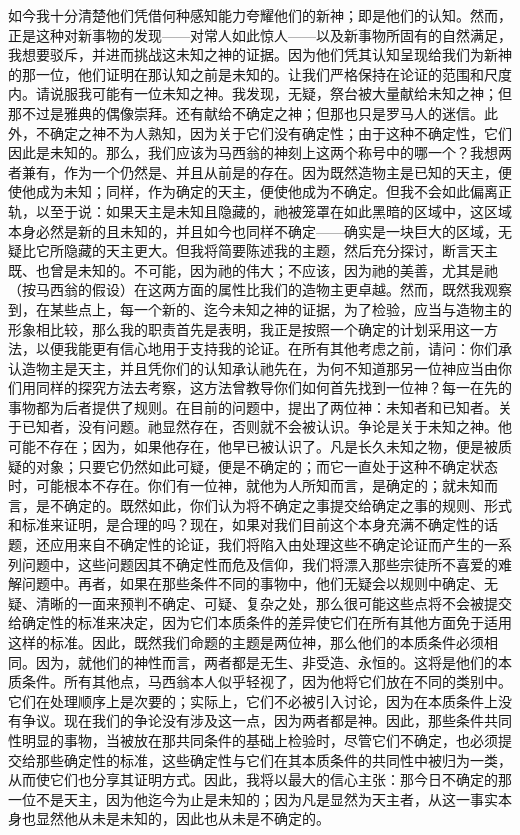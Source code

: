 如今我十分清楚他们凭借何种感知能力夸耀他们的新神；即是他们的认知。然而，正是这种对新事物的发现——对常人如此惊人——以及新事物所固有的自然满足，我想要驳斥，并进而挑战这未知之神的证据。因为他们凭其认知呈现给我们为新神的那一位，他们证明在那认知之前是未知的。让我们严格保持在论证的范围和尺度内。请说服我可能有一位未知之神。我发现，无疑，祭台被大量献给未知之神；但那不过是雅典的偶像崇拜。还有献给不确定之神；但那也只是罗马人的迷信。此外，不确定之神不为人熟知，因为关于它们没有确定性；由于这种不确定性，它们因此是未知的。那么，我们应该为马西翁的神刻上这两个称号中的哪一个？我想两者兼有，作为一个仍然是、并且从前是的存在。因为既然造物主是已知的天主，便使他成为未知；同样，作为确定的天主，便使他成为不确定。但我不会如此偏离正轨，以至于说：如果天主是未知且隐藏的，祂被笼罩在如此黑暗的区域中，这区域本身必然是新的且未知的，并且如今也同样不确定——确实是一块巨大的区域，无疑比它所隐藏的天主更大。但我将简要陈述我的主题，然后充分探讨，断言天主既、也曾是未知的。不可能，因为祂的伟大；不应该，因为祂的美善，尤其是祂（按马西翁的假设）在这两方面的属性比我们的造物主更卓越。然而，既然我观察到，在某些点上，每一个新的、迄今未知之神的证据，为了检验，应当与造物主的形象相比较，那么我的职责首先是表明，我正是按照一个确定的计划采用这一方法，以便我能更有信心地用于支持我的论证。在所有其他考虑之前，请问：你们承认造物主是天主，并且凭你们的认知承认祂先在，为何不知道那另一位神应当由你们用同样的探究方法去考察，这方法曾教导你们如何首先找到一位神？每一在先的事物都为后者提供了规则。在目前的问题中，提出了两位神：未知者和已知者。关于已知者，没有问题。祂显然存在，否则就不会被认识。争论是关于未知之神。他可能不存在；因为，如果他存在，他早已被认识了。凡是长久未知之物，便是被质疑的对象；只要它仍然如此可疑，便是不确定的；而它一直处于这种不确定状态时，可能根本不存在。你们有一位神，就他为人所知而言，是确定的；就未知而言，是不确定的。既然如此，你们认为将不确定之事提交给确定之事的规则、形式和标准来证明，是合理的吗？现在，如果对我们目前这个本身充满不确定性的话题，还应用来自不确定性的论证，我们将陷入由处理这些不确定论证而产生的一系列问题中，这些问题因其不确定性而危及信仰，我们将漂入那些宗徒所不喜爱的难解问题中。再者，如果在那些条件不同的事物中，他们无疑会以规则中确定、无疑、清晰的一面来预判不确定、可疑、复杂之处，那么很可能这些点将不会被提交给确定性的标准来决定，因为它们本质条件的差异使它们在所有其他方面免于适用这样的标准。因此，既然我们命题的主题是两位神，那么他们的本质条件必须相同。因为，就他们的神性而言，两者都是无生、非受造、永恒的。这将是他们的本质条件。所有其他点，马西翁本人似乎轻视了，因为他将它们放在不同的类别中。它们在处理顺序上是次要的；实际上，它们不必被引入讨论，因为在本质条件上没有争议。现在我们的争论没有涉及这一点，因为两者都是神。因此，那些条件共同性明显的事物，当被放在那共同条件的基础上检验时，尽管它们不确定，也必须提交给那些确定性的标准，这些确定性与它们在其本质条件的共同性中被归为一类，从而使它们也分享其证明方式。因此，我将以最大的信心主张：那今日不确定的那一位不是天主，因为他迄今为止是未知的；因为凡是显然为天主者，从这一事实本身也显然他从未是未知的，因此也从未是不确定的。\par

